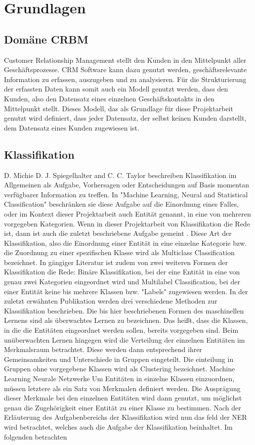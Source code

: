 \chapter{Grundlagen}

\section{Domäne CRBM}
Customer Relationship Management stellt den Kunden in den Mittelpunkt aller Geschäftsprozesse. CRM Software kann dazu genutzt werden, geschäftsrelevante Information zu erfassen, auszugeben und zu analysieren. Für die Strukturierung der erfassten Daten kann somit auch ein Modell genutzt werden, dass den Kunden, also den Datensatz eines einzelnen Geschäftskontakts in den Mittelpunkt stellt. Dieses Modell, das als Grundlage für diese Projektarbeit genutzt wird definiert, dass jeder Datensatz, der selbst keinen Kunden darstellt, dem Datensatz eines Kunden zugewiesen ist.

\section{Klassifikation}
D. Michie  D. J. Spiegelhalter  and C. C. Taylor beschreiben Klassifikation im Allgemeinen als Aufgabe, Vorhersagen oder Entscheidungen auf Basis momentan verfügbarer Information zu treffen. In "Machine Learning, Neural and Statistical Classification" beschränken sie diese Aufgabe auf die Einordnung eines Falles, oder im Kontext dieser Projektarbeit auch Entität genannt, in eine von mehreren vorgegeben Kategorien. Wenn in dieser Projektarbeit von Klassifikation die Rede ist, dann ist auch die zuletzt beschriebene Aufgabe gemeint \cite{michie}. Diese Art der Klassifikation, also die Einordnung einer Entität in eine einzelne Kategorie bzw. die Zuordnung zu einer spezifischen Klasse wird als Multiclass Classification bezeichnet. In gängiger Literatur ist zudem von zwei weiteren Formen der Klassifikation die Rede: Binäre Klassifikation, bei der eine Entität in eine von genau zwei Kategorien eingeordnet wird und Multilabel Classification, bei der einer Entität keine bis mehrere Klassen bzw. "Labels" zugewiesen werden. 
In der zuletzt erwähnten Publikation werden drei verschiedene Methoden zur Klassifikation beschrieben.
Die bis hier beschriebenen Formen des maschinellen Lernens sind als überwachtes Lernen zu bezeichnen. Das heißt, dass die Klassen, in die die Entitäten eingeordnet werden sollen, bereits vorgegeben sind. Beim unüberwachten Lernen hingegen wird die Verteilung der einzelnen Entitäten im Merkmalsraum betrachtet. Diese werden dann entsprechend ihrer Gemeinsamkeiten und Unterschiede in Gruppen eingeteilt. Die einteilung in Gruppen ohne vorgegebene Klassen wird als Clustering bezeichnet.
Machine Learning
Neurale Netzwerke
Um Entitäten in einzelne Klassen einzuordnen, müssen letztere als ein Satz von Merkmalen definiert werden. Die Ausprägung dieser Merkmale bei den einzelnen Entitäten wird dann genutzt, um möglichst genau die Zugehörigkeit einer Entität zu einer Klasse zu bestimmen.
Nach der Erläuterung des Aufgabenbereichs der Klassifikation wird nun das feld der NER wird betrachtet, welches auch die Aufgabe der Klassifikation beinhaltet.
Im folgenden betrachten 


